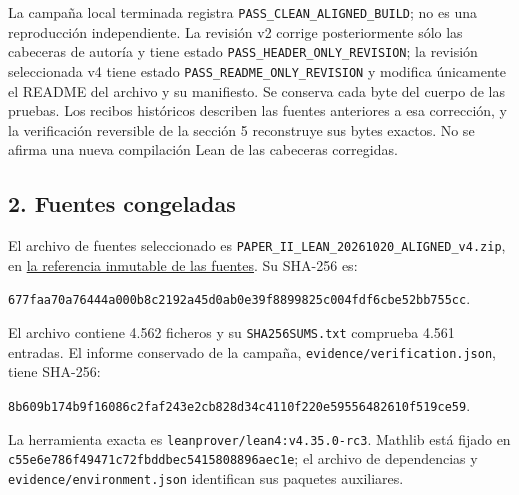 \documentclass[spanish,11pt,a4paper]{article}
\begin{document}
La campaña local terminada registra \texttt{PASS\_\allowbreak{}CLEAN\_\allowbreak{}A\allowbreak{}LIGNED\_\allowbreak{}BUILD\allowbreak{}}; no es una reproducción independiente. La revisión v2 corrige posteriormente sólo las cabeceras de autoría y tiene estado \texttt{PASS\_\allowbreak{}HEADER\_\allowbreak{}\allowbreak{}ONLY\_\allowbreak{}REVISIO\allowbreak{}N}; la revisión seleccionada v4 tiene estado \texttt{PASS\_\allowbreak{}README\_\allowbreak{}\allowbreak{}ONLY\_\allowbreak{}REVISIO\allowbreak{}N} y modifica únicamente el README del archivo y su manifiesto. Se conserva cada byte del cuerpo de las pruebas. Los recibos históricos describen las fuentes anteriores a esa corrección, y la verificación reversible de la sección 5 reconstruye sus bytes exactos. No se afirma una nueva compilación Lean de las cabeceras corregidas.


\subsection{2. Fuentes congeladas}\label{fuentes-congeladas}

El archivo de fuentes seleccionado es \texttt{PAPER\_\allowbreak{}II\_\allowbreak{}LEA\allowbreak{}N\_\allowbreak{}20261020\_\allowbreak{}A\allowbreak{}LIGNED\_\allowbreak{}v4.\allowbreak{}zi\allowbreak{}p}, en \href{https://github.com/jtraverso/nash-williams-triangle-decompositions-release/blob/d6d020982ebf3f3cd8c104b6befc6c094850b3e7/archives/PAPER_II_LEAN_20261020_ALIGNED_v4.zip}{la referencia inmutable de las fuentes}. Su SHA-256 es:

\texttt{677faa70\allowbreak{}a764\allowbreak{}44a0\allowbreak{}00b8c219\allowbreak{}\allowbreak{}2a45d0ab\allowbreak{}0e39\allowbreak{}f889\allowbreak{}9825c004\allowbreak{}\allowbreak{}fdf6cbe5\allowbreak{}2bb7\allowbreak{}55cc\allowbreak{}}.

El archivo contiene 4.562 ficheros y su \texttt{SHA256SUMS.\allowbreak{}t\allowbreak{}xt} comprueba 4.561 entradas. El informe conservado de la campaña, \texttt{evidence/\allowbreak{}ver\allowbreak{}ification.\allowbreak{}js\allowbreak{}on}, tiene SHA-256:

\texttt{8b609b17\allowbreak{}4b9f\allowbreak{}1608\allowbreak{}6c2faf24\allowbreak{}\allowbreak{}3e2cb828\allowbreak{}d34c\allowbreak{}4110\allowbreak{}f220e595\allowbreak{}\allowbreak{}56482610\allowbreak{}f519\allowbreak{}ce59\allowbreak{}}.

La herramienta exacta es \texttt{leanprover/\allowbreak{}l\allowbreak{}ean4:v4.\allowbreak{}35.\allowbreak{}0\allowbreak{}-\allowbreak{}rc3}. Mathlib está fijado en \texttt{c55e6e78\allowbreak{}6f49\allowbreak{}471c\allowbreak{}72fbddbe\allowbreak{}\allowbreak{}c5415808\allowbreak{}896a\allowbreak{}ec1e\allowbreak{}}; el archivo de dependencias y \texttt{evidence/\allowbreak{}env\allowbreak{}ironment.\allowbreak{}jso\allowbreak{}n} identifican sus paquetes auxiliares.
\end{document}
